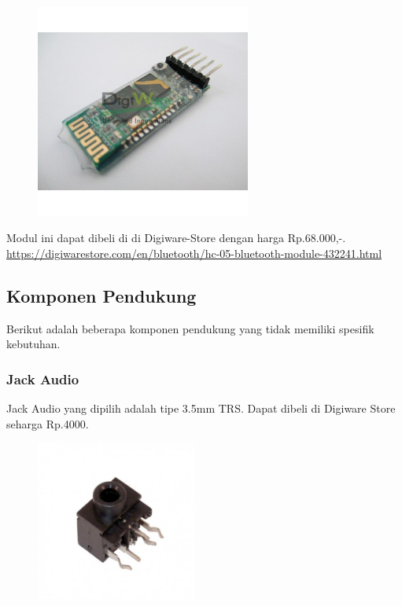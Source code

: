 \documentclass[12pt,]{article}
\begin{document}
	\begin{figure}[!ht]
		\centering
		\includegraphics[width=200pt]{images/hc05}
	\end{figure}
	
	Modul ini dapat dibeli di di Digiware-Store dengan harga Rp.68.000,-.\\
	\url{https://digiwarestore.com/en/bluetooth/hc-05-bluetooth-module-432241.html}
	
	\subsection{Komponen Pendukung}
	
	Berikut adalah beberapa komponen pendukung yang tidak memiliki spesifik kebutuhan.
	
	\subsubsection{Jack Audio}
	
	Jack Audio yang dipilih adalah tipe 3.5mm TRS.
	Dapat dibeli di Digiware Store seharga Rp.4000.
	
	\begin{figure}[!ht]
		\centering
		\includegraphics[width=150pt]{images/jackaudio}
	\end{figure}
\end{document}
